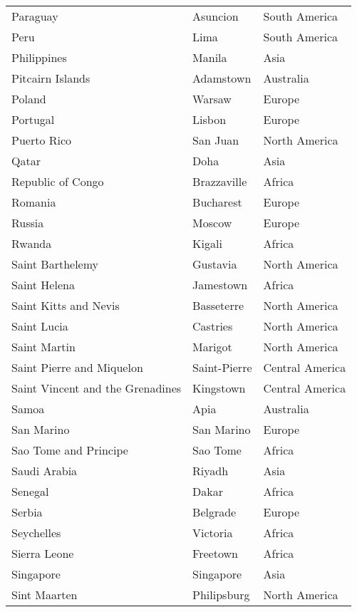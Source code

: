 \begin{longtable}{>{\raggedright}p{}>{\centering}p{}p{}}
Paraguay        & Asuncion          & South America\\
Peru            & Lima              & South America\\
Philippines     & Manila            & Asia\\
Pitcairn Islands & Adamstown        & Australia\\
Poland          & Warsaw            & Europe\\
Portugal        & Lisbon            & Europe\\
Puerto Rico     & San Juan          & North America\\
Qatar           & Doha              & Asia\\
Republic of Congo & Brazzaville     & Africa\\
Romania         & Bucharest         & Europe\\
Russia          & Moscow            & Europe\\
Rwanda          & Kigali            & Africa\\
Saint Barthelemy & Gustavia         & North America\\
Saint Helena    & Jamestown         & Africa\\
Saint Kitts and Nevis & Basseterre  & North America\\
Saint Lucia     & Castries          & North America\\
Saint Martin    & Marigot           & North America\\
Saint Pierre and Miquelon & Saint-Pierre & Central America\\
Saint Vincent and the Grenadines & Kingstown & Central America\\
Samoa           & Apia              & Australia\\
San Marino      & San Marino        & Europe\\
Sao Tome and Principe & Sao Tome    & Africa\\
Saudi Arabia    & Riyadh            & Asia\\
Senegal         & Dakar             & Africa\\
Serbia          & Belgrade          & Europe\\
Seychelles      & Victoria          & Africa\\
Sierra Leone    & Freetown          & Africa\\
Singapore       & Singapore         & Asia\\
Sint Maarten    & Philipsburg       & North America\\

\end{longtable}

